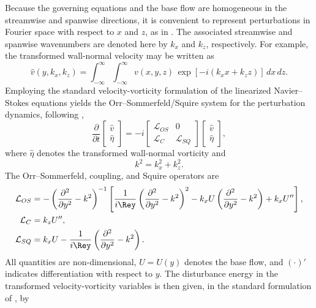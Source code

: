 Because the governing equations and the base flow are homogeneous in the streamwise and spanwise directions, it is convenient to represent perturbations in Fourier space with respect to \(x\) and \(z\), as in \citet{schmid-henningson-2001}. The associated streamwise and spanwise wavenumbers are denoted here by \(k_x\) and \(k_z\), respectively. For example, the transformed wall-normal velocity may be written as
\begin{equation}
  \hat{v}(y,k_x,k_z)
  =
  \int_{-\infty}^{\infty}
  \int_{-\infty}^{\infty}
  v(x,y,z)\,
  \exp\!\left[-i(k_x x+k_z z)\right]
  \,dx\,dz.
\end{equation}
Employing the standard velocity-vorticity formulation of the linearized Navier--Stokes equations yields the Orr--Sommerfeld/Squire system for the perturbation dynamics, following \citet{schmid-henningson-2001},
\begin{equation}
  \frac{\partial}{\partial t}
  \begin{bmatrix}
    \hat{v}\\
    \hat{\eta}
  \end{bmatrix}
  =
  -i
  \begin{bmatrix}
    \mathcal{L}_{OS} & 0\\
    \mathcal{L}_{C} & \mathcal{L}_{SQ}
  \end{bmatrix}
  \begin{bmatrix}
    \hat{v}\\
    \hat{\eta}
  \end{bmatrix},
\end{equation}
where \(\hat{\eta}\) denotes the transformed wall-normal vorticity and
\begin{equation}
  k^2 = k_x^2 + k_z^2.
\end{equation}
The Orr--Sommerfeld, coupling, and Squire operators are
\begin{align}
  \mathcal{L}_{OS}
  &=
  -\left(
    \frac{\partial^2}{\partial y^2}-k^2
  \right)^{-1}
  \left[
    \frac{1}{i\Rey}
    \left(
      \frac{\partial^2}{\partial y^2}-k^2
    \right)^2
    - k_x U
    \left(
      \frac{\partial^2}{\partial y^2}-k^2
    \right)
    + k_x U''
  \right], \\
  \mathcal{L}_{C}
  &= k_z U'', \\
  \mathcal{L}_{SQ}
  &= k_x U - \frac{1}{i\Rey}
  \left(
    \frac{\partial^2}{\partial y^2}-k^2
  \right).
\end{align}
All quantities are non-dimensional, \(U=U(y)\) denotes the base flow, and \((\cdot)'\) indicates differentiation with respect to \(y\). The disturbance energy in the transformed velocity-vorticity variables is then given, in the standard formulation of \citet{schmid-henningson-2001}, by
